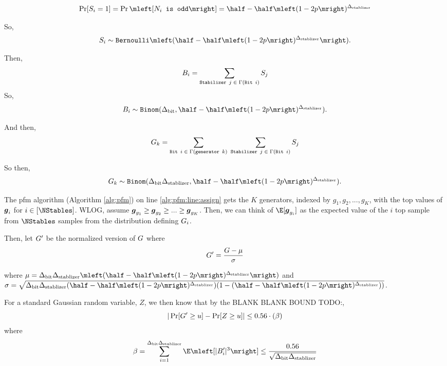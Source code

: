 \newcommand{\SPr}{\half - \half\mleft(1-2p\mright)^\NTQ}
\begin{align*}
	\Pr[S_i = 1] = \Pr\mleft[\texttt{$N_i$ is odd}\mright] = \SPr
\end{align*}

So,
$$
	\syndromeRV_i \sim \texttt{Bernoulli}\mleft(\SPr\mright).
$$

Then,
$$
	B_i = \sum_{\texttt{Stabilizer $j$} \; \in \; \Gamma(\texttt{Bit $i$})} S_j
$$
So, 
$$
	\bitscoreRV_i \sim \texttt{Binom}(\NTS, \SPr).
$$

And then,
$$
	G_k =
		\sum_{\texttt{Bit $i$} \; \in \; \Gamma(\texttt{generator } k)}\;
			\sum_{\texttt{Stabilizer } j \; \in \; \Gamma(\texttt{Bit } i)}
				S_j
$$

So then,
$$
	\generatorscoreRV_k \sim \texttt{Binom}(\NTS \NTQ, \SPr).
$$

The pfm algorithm (Algorithm \ref{alg:pfm}) on line \ref{alg:pfm:line:assign}
gets the $K$ generators, indexed by $g_1, g_2, ..., g_K$, with the top values
of $\boldsymbol{g}_i$ for $i \in [\NStables]$. WLOG, assume
$\boldsymbol{g}_{g_1} \geq \boldsymbol{g}_{g_2} \geq ... \geq \boldsymbol{g}_{g_K}$.
Then, we can think of $\E[\generatorscorevec_{g_i}]$ as the expected value of the $i$ 
top sample from $\NStables$ samples from the distribution defining $G_i$.

Then, let $G'$ be the normalized version of $G$ where
$$
	G' = \frac{G - \mu}{\sigma}
$$

\newcommand{\muexp}{\NTS \NTQ \mleft(\SPr\mright)}
\newcommand{\sigmaexp}{ \sqrt{\NTS \NTQ (\SPr) (1 - (\SPr))}}
where $\mu = \muexp$ and $\sigma = \sigmaexp$.

For a standard Gaussian random variable, $Z$, we then know that by the BLANK BLANK BOUND TODO:,
$$
	|\Pr[G' \geq u] - \Pr[Z \geq u]| \leq 0.56 \cdot (\beta)
$$
where
$$
	\beta =
		\sum_{i=1}^{\NTS \NTQ} \E\mleft[|B'_i|^3\mright] \leq \frac{0.56}{\sqrt{\NTS \NTQ}}
$$


